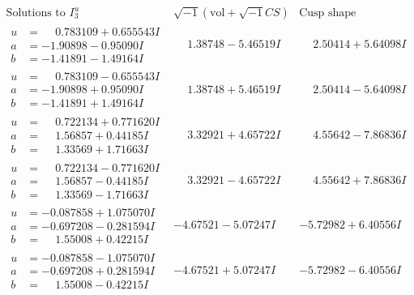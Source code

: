 \documentclass[1p]{elsarticle_modified}
\theoremstyle{definition}
\newcommand{\I}{\sqrt{-1}}
\begin{document}
$$\begin{array}{c|c|c}  
\text{Solutions to }I^u_{3}& \I (\text{vol} + \sqrt{-1}CS) & \text{Cusp shape}\\
 \hline 
\begin{aligned}
u &= \phantom{-}0.783109 + 0.655543 I \\
a &= -1.90898 - 0.95090 I \\
b &= -1.41891 - 1.49164 I\end{aligned}
 & \phantom{-}1.38748 - 5.46519 I & \phantom{-}2.50414 + 5.64098 I \\ \hline\begin{aligned}
u &= \phantom{-}0.783109 - 0.655543 I \\
a &= -1.90898 + 0.95090 I \\
b &= -1.41891 + 1.49164 I\end{aligned}
 & \phantom{-}1.38748 + 5.46519 I & \phantom{-}2.50414 - 5.64098 I \\ \hline\begin{aligned}
u &= \phantom{-}0.722134 + 0.771620 I \\
a &= \phantom{-}1.56857 + 0.44185 I \\
b &= \phantom{-}1.33569 + 1.71663 I\end{aligned}
 & \phantom{-}3.32921 + 4.65722 I & \phantom{-}4.55642 - 7.86836 I \\ \hline\begin{aligned}
u &= \phantom{-}0.722134 - 0.771620 I \\
a &= \phantom{-}1.56857 - 0.44185 I \\
b &= \phantom{-}1.33569 - 1.71663 I\end{aligned}
 & \phantom{-}3.32921 - 4.65722 I & \phantom{-}4.55642 + 7.86836 I \\ \hline\begin{aligned}
u &= -0.087858 + 1.075070 I \\
a &= -0.697208 - 0.281594 I \\
b &= \phantom{-}1.55008 + 0.42215 I\end{aligned}
 & -4.67521 - 5.07247 I & -5.72982 + 6.40556 I \\ \hline\begin{aligned}
u &= -0.087858 - 1.075070 I \\
a &= -0.697208 + 0.281594 I \\
b &= \phantom{-}1.55008 - 0.42215 I\end{aligned}
 & -4.67521 + 5.07247 I & -5.72982 - 6.40556 I \\ \hline\begin{aligned}

\end{aligned}
\end{array}$$
\end{document}
